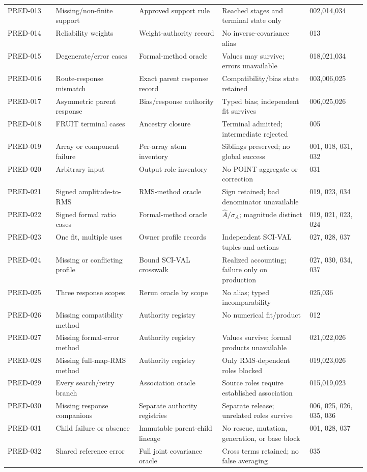 \documentclass[11pt]{article}
\begin{document}
{\begin{longtable}{@{}P{0.11\linewidth}P{0.19\linewidth}P{0.19\linewidth}P{0.20\linewidth}P{0.13\linewidth}@{}}
PRED-013 & Missing/non-finite support & Approved support rule & Reached stages and terminal state only & 002,014,034 \\
PRED-014 & Reliability weights & Weight-authority record & No inverse-covariance alias & 013 \\
PRED-015 & Degenerate/error cases & Formal-method oracle & Values may survive; errors unavailable & 018,021,034 \\
PRED-016 & Route-response mismatch & Exact parent response record & Compatibility/bias state retained & 003,006,025 \\
PRED-017 & Asymmetric parent response & Bias/response authority & Typed bias; independent fit survives & 006,025,026 \\
PRED-018 & FRUIT terminal cases & Ancestry closure & Terminal admitted; intermediate rejected & 005 \\
PRED-019 & Array or component failure & Per-array atom inventory & Siblings preserved; no global success & 001, 018, 031, 032 \\
PRED-020 & Arbitrary input & Output-role inventory & No POINT aggregate or correction & 031 \\
PRED-021 & Signed amplitude-to-RMS & RMS-method oracle & Sign retained; bad denominator unavailable & 019, 023, 034 \\
PRED-022 & Signed formal ratio cases & Formal-method oracle & $\widehat A/\sigma_A$; magnitude distinct & 019, 021, 023, 024 \\
PRED-023 & One fit, multiple uses & Owner profile records & Independent SCI-VAL tuples and actions & 027, 028, 037 \\
PRED-024 & Missing or conflicting profile & Bound SCI-VAL crosswalk & Realized accounting; failure only on production & 027, 030, 034, 037 \\
PRED-025 & Three response scopes & Rerun oracle by scope & No alias; typed incomparability & 025,036 \\
PRED-026 & Missing compatibility method & Authority registry & No numerical fit/product & 012 \\
PRED-027 & Missing formal-error method & Authority registry & Values survive; formal products unavailable & 021,022,026 \\
PRED-028 & Missing full-map-RMS method & Authority registry & Only RMS-dependent roles blocked & 019,023,026 \\
PRED-029 & Every search/retry branch & Association oracle & Source roles require established association & 015,019,023 \\
PRED-030 & Missing response companions & Separate authority registries & Separate release; unrelated roles survive & 006, 025, 026, 035, 036 \\
PRED-031 & Child failure or absence & Immutable parent-child lineage & No rescue, mutation, generation, or base block & 001, 028, 037 \\
PRED-032 & Shared reference error & Full joint covariance oracle & Cross terms retained; no false averaging & 035 \\
\bottomrule
\end{longtable}
}
\end{document}
